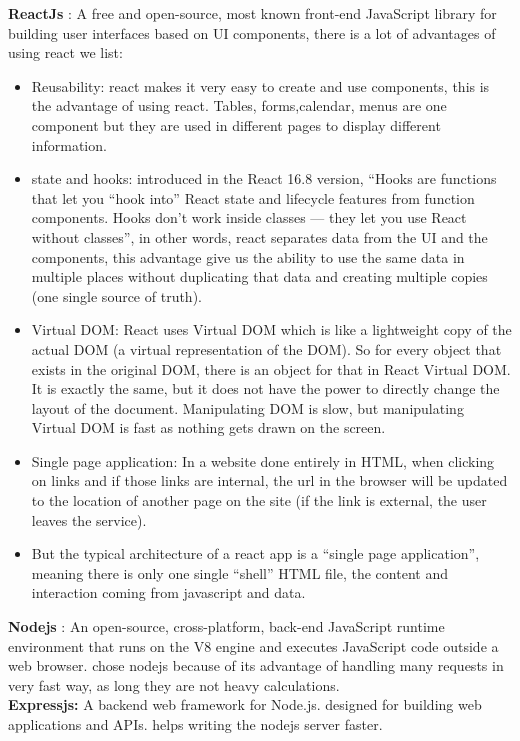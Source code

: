 \documentclass[]{uc2pfecaneva}
\begin{document}
    \noindent
    \textbf{ReactJs} :  A free and open-source, most known front-end JavaScript library for building user interfaces based on UI components, there is a lot of advantages of using react we list:
    \begin{itemize}
        \item Reusability: react makes it very easy to create and use components, this is the advantage of using react.
        Tables, forms,calendar, menus are one component but they are used in different pages to display different information.
        \item state and hooks:  introduced in the React 16.8 version, “Hooks are functions that let you “hook into” React state and lifecycle features from function components.
        Hooks don’t work inside classes — they let you use React without classes”, in other words, react separates data from the UI and the components, this advantage give us the ability to use the same data in multiple places without duplicating that data and creating multiple copies (one single source of truth).
        \item Virtual DOM:  React uses Virtual DOM which is like a lightweight copy of the actual DOM (a virtual representation of the DOM).
        So for every object that exists in the original DOM, there is an object for that in React Virtual DOM. It is exactly the same, but it does not have the power to directly change the layout of the document.
        Manipulating DOM is slow, but manipulating Virtual DOM is fast as nothing gets drawn on the screen.
        \item Single page application: In a website done entirely in HTML, when clicking on links and if those links are internal, the url in the browser will be updated to the location of another page on the site (if the link is external, the user leaves the service).
        \item But the typical architecture of a react app is a “single page application”, meaning there is only one single “shell” HTML file, the content and interaction coming from javascript and data.
    \end{itemize}
    \textbf{Nodejs} : An open-source, cross-platform, back-end JavaScript runtime environment that runs on the V8 engine and executes JavaScript code outside a web browser.
    chose nodejs because of its advantage of handling many requests in very fast way, as long they are not heavy calculations. \\

    \noindent
    \textbf{Expressjs: } A backend web framework for Node.js.
    designed for building web applications and APIs.
    helps writing the nodejs server faster. \\
\end{document}
